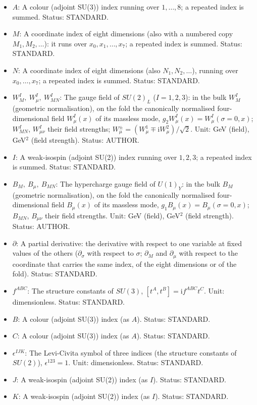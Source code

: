 \documentclass[
  10pt,
]{article}
\begin{document}
\begin{itemize}
  \(G^A_{\mu\nu}\) their field strengths. Unit: GeV (field), GeV\(^2\)
  (field strength). Status: AUTHOR.
\item
  \(A\): A colour (adjoint SU(3)) index running over \(1, \dots, 8\); a
  repeated index is summed. Status: STANDARD.
\item
  \(M\): A coordinate index of eight dimensions (also with a numbered
  copy \(M_1, M_2, \dots\)): it runs over \(x_0, x_1, \dots, x_7\); a
  repeated index is summed. Status: STANDARD.
\item
  \(N\): A coordinate index of eight dimensions (also
  \(N_1, N_2, \dots\)), running over \(x_0, \dots, x_7\); a repeated
  index is summed. Status: STANDARD.
\item
  \(W^I_M,\ W^I_\mu,\ W^I_{MN}\): The gauge field of \(SU(2)_L\)
  (\(I = 1, 2, 3\)): in the bulk \(W^I_M\) (geometric normalisation), on
  the fold the canonically normalised four-dimensional field
  \(W^I_\mu(x)\) of its massless mode,
  \(g_2W^I_\mu(x) = W^I_\mu(\sigma = 0, x)\); \(W^I_{MN}\),
  \(W^I_{\mu\nu}\) their field strengths;
  \(W^\pm_\mu = (W^1_\mu \mp \mathrm{i}W^2_\mu)/\sqrt2\). Unit: GeV
  (field), GeV\(^2\) (field strength). Status: AUTHOR.
\item
  \(I\): A weak-isospin (adjoint SU(2)) index running over \(1, 2, 3\);
  a repeated index is summed. Status: STANDARD.
\item
  \(B_M,\ B_\mu,\ B_{MN}\): The hypercharge gauge field of \(U(1)_Y\):
  in the bulk \(B_M\) (geometric normalisation), on the fold the
  canonically normalised four-dimensional field \(B_\mu(x)\) of its
  massless mode, \(g_1B_\mu(x) = B_\mu(\sigma = 0, x)\); \(B_{MN}\),
  \(B_{\mu\nu}\) their field strengths. Unit: GeV (field), GeV\(^2\)
  (field strength). Status: AUTHOR.
\item
  \(\partial\): A partial derivative: the derivative with respect to one
  variable at fixed values of the others (\(\partial_\sigma\) with
  respect to \(\sigma\); \(\partial_M\) and \(\partial_\mu\) with
  respect to the coordinate that carries the same index, of the eight
  dimensions or of the fold). Status: STANDARD.
\item
  \(f^{ABC}\): The structure constants of \(SU(3)\),
  \([t^A, t^B] = \mathrm{i}f^{ABC}t^C\). Unit: dimensionless. Status:
  STANDARD.
\item
  \(B\): A colour (adjoint SU(3)) index (as \(A\)). Status: STANDARD.
\item
  \(C\): A colour (adjoint SU(3)) index (as \(A\)). Status: STANDARD.
\item
  \(\epsilon^{IJK}\): The Levi-Civita symbol of three indices (the
  structure constants of \(SU(2)\)), \(\epsilon^{123} = 1\). Unit:
  dimensionless. Status: STANDARD.
\item
  \(J\): A weak-isospin (adjoint SU(2)) index (as \(I\)). Status:
  STANDARD.
\item
  \(K\): A weak-isospin (adjoint SU(2)) index (as \(I\)). Status:
  STANDARD.
\end{itemize}
\end{document}
